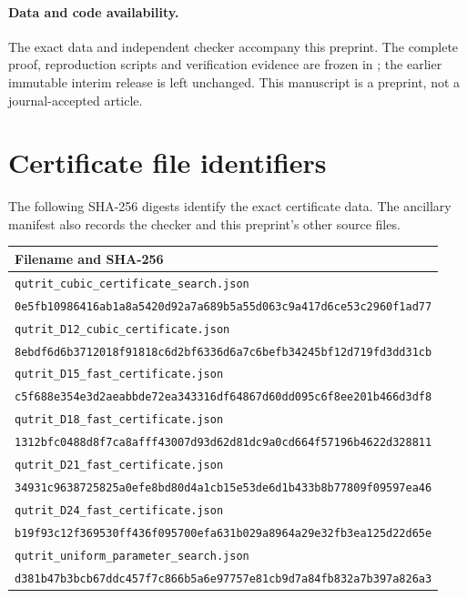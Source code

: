 \documentclass[11pt]{article}
\theoremstyle{remark}\newtheorem{remark}[theorem]{Remark}
\begin{document}
\paragraph{Data and code availability.}
The exact data and independent checker accompany this preprint. The complete proof, reproduction scripts and verification evidence are frozen in \cite{ProofRelease}; the earlier immutable interim release is left unchanged. This manuscript is a preprint, not a journal-accepted article.

\appendix
\section{Certificate file identifiers}\label{app:data}
The following SHA-256 digests identify the exact certificate data. The ancillary manifest also records the checker and this preprint's other source files.
\begingroup\footnotesize
\begin{longtable}{p{}}
\toprule
\textbf{Filename and SHA-256}\\\midrule
\endhead
\texttt{qutrit\_cubic\_certificate\_search.json}\\
\nolinkurl{0e5fb10986416ab1a8a5420d92a7a689b5a55d063c9a417d6ce53c2960f1ad77}\\[2pt]
\texttt{qutrit\_D12\_cubic\_certificate.json}\\
\nolinkurl{8ebdf6d6b3712018f91818c6d2bf6336d6a7c6befb34245bf12d719fd3dd31cb}\\[2pt]
\texttt{qutrit\_D15\_fast\_certificate.json}\\
\nolinkurl{c5f688e354e3d2aeabbde72ea343316df64867d60dd095c6f8ee201b466d3df8}\\[2pt]
\texttt{qutrit\_D18\_fast\_certificate.json}\\
\nolinkurl{1312bfc0488d8f7ca8afff43007d93d62d81dc9a0cd664f57196b4622d328811}\\[2pt]
\texttt{qutrit\_D21\_fast\_certificate.json}\\
\nolinkurl{34931c9638725825a0efe8bd80d4a1cb15e53de6d1b433b8b77809f09597ea46}\\[2pt]
\texttt{qutrit\_D24\_fast\_certificate.json}\\
\nolinkurl{b19f93c12f369530ff436f095700efa631b029a8964a29e32fb3ea125d22d65e}\\[2pt]
\texttt{qutrit\_uniform\_parameter\_search.json}\\
\nolinkurl{d381b47b3bcb67ddc457f7c866b5a6e97757e81cb9d7a84fb832a7b397a826a3}\\
\bottomrule
\end{longtable}\endgroup
\end{document}

